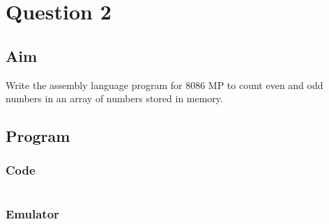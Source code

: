 \documentclass{article}
\begin{document}

\break
\section{Question 2}

\subsection{Aim}
Write the assembly language program for 8086 MP to count even and odd numbers in an array of numbers stored in memory.


\subsection{Program}
\subsubsection{Code}
\inputminted{nasm}{"C:/Users/aadit/Documents/BTech/5th Semester/MC Lab/8086 Pgrm 1/EVEN_ODD_COUNT.asm"}

\subsubsection{Emulator}
\end{document}
